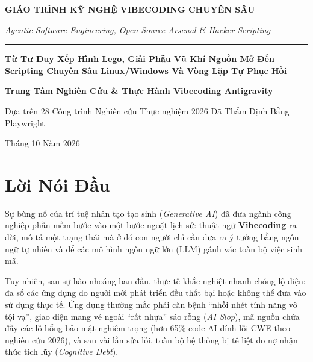 \documentclass[a4paper,11pt]{report}
\begin{document}
\begin{titlepage}
    \centering
    \vspace*{1.5cm}
    
    {\Huge \textbf{GIÁO TRÌNH KỸ NGHỆ VIBECODING CHUYÊN SÂU}\par}
    \vspace{0.8em}
    {\LARGE \textit{Agentic Software Engineering, Open-Source Arsenal \& Hacker Scripting}\par}
    
    \vspace{1.5cm}
    \rule{0.8\textwidth}{1.5pt}\par
    \vspace{1.5cm}
    
    {\Large \textbf{Từ Tư Duy Xếp Hình Lego, Giải Phẫu Vũ Khí Nguồn Mở Đến Scripting Chuyên Sâu Linux/Windows Và Vòng Lặp Tự Phục Hồi}\par}
    
    \vfill
    
    {\large \textbf{Trung Tâm Nghiên Cứu \& Thực Hành Vibecoding Antigravity}\par}
    \vspace{0.5em}
    {\normalsize Dựa trên 28 Công trình Nghiên cứu Thực nghiệm 2026 Đã Thẩm Định Bằng Playwright\par}
    \vspace{1.5cm}
    
    {\large Tháng 10 Năm 2026}\par
\end{titlepage}

\chapter*{Lời Nói Đầu}

Sự bùng nổ của trí tuệ nhân tạo tạo sinh (\textit{Generative AI}) đã đưa ngành công nghiệp phần mềm bước vào một bước ngoặt lịch sử: thuật ngữ \textbf{Vibecoding} ra đời, mô tả một trạng thái mà ở đó con người chỉ cần đưa ra ý tưởng bằng ngôn ngữ tự nhiên và để các mô hình ngôn ngữ lớn (LLM) gánh vác toàn bộ việc sinh mã. 

Tuy nhiên, sau sự hào nhoáng ban đầu, thực tế khắc nghiệt nhanh chóng lộ diện: đa số các ứng dụng do người mới phát triển đều thất bại hoặc không thể đưa vào sử dụng thực tế. Ứng dụng thường mắc phải căn bệnh ``nhồi nhét tính năng vô tội vạ'', giao diện mang vẻ ngoài ``rất nhựa'' sáo rỗng (\textit{AI Slop}), mã nguồn chứa đầy các lỗ hổng bảo mật nghiêm trọng (hơn 65\% code AI dính lỗi CWE theo nghiên cứu 2026), và sau vài lần sửa lỗi, toàn bộ hệ thống bị tê liệt do nợ nhận thức tích lũy (\textit{Cognitive Debt}).
\end{document}
